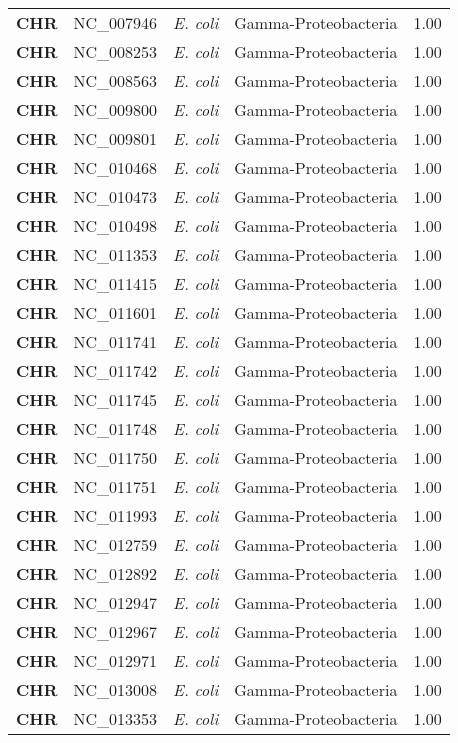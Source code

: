 \begin{adjustwidth}{-3cm}{2cm}
{\begin{supertabular}{>{\bfseries}l|p{0.1\textwidth}p{0.14\textwidth}l|l}
CHR & NC\_007946 & \textit{E. coli} & Gamma-Proteobacteria & 1.00\\
CHR & NC\_008253 & \textit{E. coli} & Gamma-Proteobacteria & 1.00\\
CHR & NC\_008563 & \textit{E. coli} & Gamma-Proteobacteria & 1.00\\
CHR & NC\_009800 & \textit{E. coli} & Gamma-Proteobacteria & 1.00\\
CHR & NC\_009801 & \textit{E. coli} & Gamma-Proteobacteria & 1.00\\
CHR & NC\_010468 & \textit{E. coli} & Gamma-Proteobacteria & 1.00\\
CHR & NC\_010473 & \textit{E. coli} & Gamma-Proteobacteria & 1.00\\
CHR & NC\_010498 & \textit{E. coli} & Gamma-Proteobacteria & 1.00\\
CHR & NC\_011353 & \textit{E. coli} & Gamma-Proteobacteria & 1.00\\
CHR & NC\_011415 & \textit{E. coli} & Gamma-Proteobacteria & 1.00\\
CHR & NC\_011601 & \textit{E. coli} & Gamma-Proteobacteria & 1.00\\
CHR & NC\_011741 & \textit{E. coli} & Gamma-Proteobacteria & 1.00\\
CHR & NC\_011742 & \textit{E. coli} & Gamma-Proteobacteria & 1.00\\
CHR & NC\_011745 & \textit{E. coli} & Gamma-Proteobacteria & 1.00\\
CHR & NC\_011748 & \textit{E. coli} & Gamma-Proteobacteria & 1.00\\
CHR & NC\_011750 & \textit{E. coli} & Gamma-Proteobacteria & 1.00\\
CHR & NC\_011751 & \textit{E. coli} & Gamma-Proteobacteria & 1.00\\
CHR & NC\_011993 & \textit{E. coli} & Gamma-Proteobacteria & 1.00\\
CHR & NC\_012759 & \textit{E. coli} & Gamma-Proteobacteria & 1.00\\
CHR & NC\_012892 & \textit{E. coli} & Gamma-Proteobacteria & 1.00\\
CHR & NC\_012947 & \textit{E. coli} & Gamma-Proteobacteria & 1.00\\
CHR & NC\_012967 & \textit{E. coli} & Gamma-Proteobacteria & 1.00\\
CHR & NC\_012971 & \textit{E. coli} & Gamma-Proteobacteria & 1.00\\
CHR & NC\_013008 & \textit{E. coli} & Gamma-Proteobacteria & 1.00\\
CHR & NC\_013353 & \textit{E. coli} & Gamma-Proteobacteria & 1.00\\

\end{supertabular}}
\end{adjustwidth}
